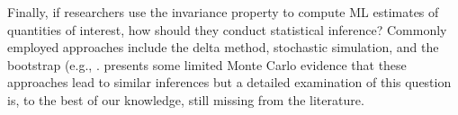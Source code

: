 \documentclass[11pt]{article}
\begin{document}
Finally, if researchers use the invariance property to compute ML estimates of quantities of interest, how should they conduct statistical inference?
Commonly employed approaches include the delta method, stochastic simulation, and the bootstrap (e.g., \cite{EfronTibshirani1993}.
\cite{KrinskyRobb1991} presents some limited Monte Carlo evidence that these approaches lead to similar inferences but a detailed examination of this question is, to the best of our knowledge, still missing from the literature.

\singlespace
\clearpage
\small


\end{document}
